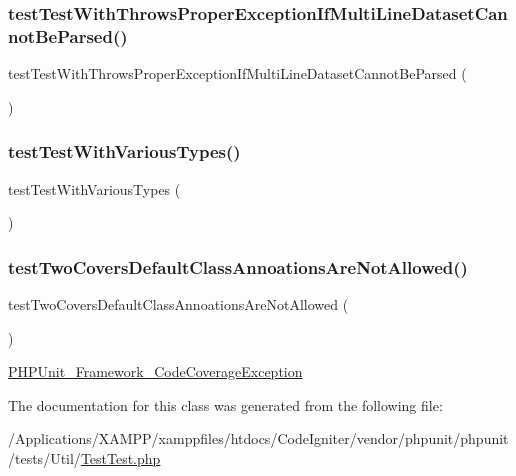 \subsubsection{\texorpdfstring{test\+Test\+With\+Throws\+Proper\+Exception\+If\+Multi\+Line\+Dataset\+Cannot\+Be\+Parsed()}{testTestWithThrowsProperExceptionIfMultiLineDatasetCannotBeParsed()}}
{\footnotesize\ttfamily test\+Test\+With\+Throws\+Proper\+Exception\+If\+Multi\+Line\+Dataset\+Cannot\+Be\+Parsed (\begin{DoxyParamCaption}{ }\end{DoxyParamCaption})}

\mbox{\label{class_util___test_test_aa41174eef3c26e18d2011724baa4eff5}} 
\subsubsection{\texorpdfstring{test\+Test\+With\+Various\+Types()}{testTestWithVariousTypes()}}
{\footnotesize\ttfamily test\+Test\+With\+Various\+Types (\begin{DoxyParamCaption}{ }\end{DoxyParamCaption})}

\mbox{\label{class_util___test_test_a3dbbee3d4a70c20779525bbf522b0f7f}} 
\subsubsection{\texorpdfstring{test\+Two\+Covers\+Default\+Class\+Annoations\+Are\+Not\+Allowed()}{testTwoCoversDefaultClassAnnoationsAreNotAllowed()}}
{\footnotesize\ttfamily test\+Two\+Covers\+Default\+Class\+Annoations\+Are\+Not\+Allowed (\begin{DoxyParamCaption}{ }\end{DoxyParamCaption})}

\mbox{\hyperlink{class_p_h_p_unit___framework___code_coverage_exception}{P\+H\+P\+Unit\+\_\+\+Framework\+\_\+\+Code\+Coverage\+Exception}} 

The documentation for this class was generated from the following file\+:\begin{DoxyCompactItemize}
\item 
/\+Applications/\+X\+A\+M\+P\+P/xamppfiles/htdocs/\+Code\+Igniter/vendor/phpunit/phpunit/tests/\+Util/\mbox{\hyperlink{_test_test_8php}{Test\+Test.\+php}}\end{DoxyCompactItemize}
